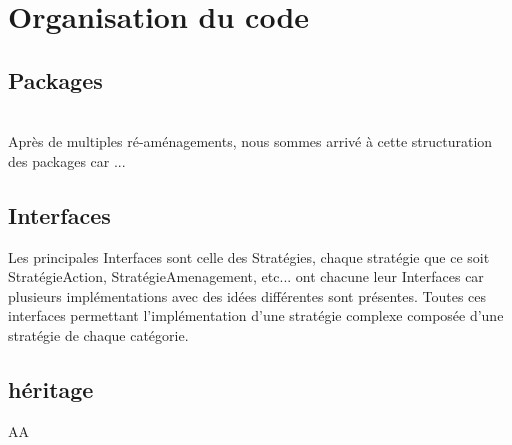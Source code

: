\chapter{Organisation du code }

\section{Packages}



~\\
  Après de multiples ré-aménagements, nous sommes arrivé à cette structuration des packages car ...


\section{Interfaces}
Les principales Interfaces sont celle des Stratégies, chaque stratégie que ce soit StratégieAction, StratégieAmenagement, etc... ont chacune leur Interfaces car plusieurs implémentations avec des idées différentes sont présentes. Toutes ces interfaces permettant l'implémentation d'une stratégie complexe composée d'une stratégie de chaque catégorie. 

\section{héritage}
AA